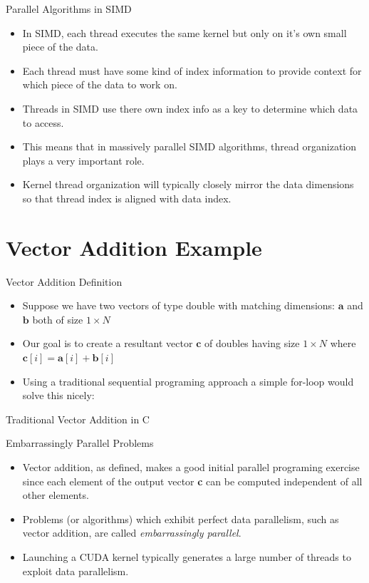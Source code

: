 \documentclass[handout]{beamer}
\begin{document}
\begin{frame}{Parallel Algorithms in SIMD}
\begin{itemize}
	\item<1->In SIMD, each thread executes the same kernel but only on it's own small piece of the data.
	\item<1->Each thread must have some kind of index information to provide context for which piece of the data to work on.
	\item<1->Threads in SIMD use there own index info as a key to determine which data to access.
	\item<1->This means that in massively parallel SIMD algorithms, thread organization plays a very important role.
	\item<1->Kernel thread organization will typically closely mirror the data dimensions so that thread index is aligned with data index.  
\end{itemize}
\end{frame}

\section{Vector Addition Example}
\begin{frame}{Vector Addition Definition}
\begin{itemize}
\itemsep1em
	\item<1>Suppose we have two vectors of type double with matching dimensions: $\textbf{a}$ and $\textbf{b}$ both of size $1\times N$
	\item<1>Our goal is to create a resultant vector $\textbf{c}$ of doubles having size $1\times N$ where $\textbf{c}[i] = \textbf{a}[i]+\textbf{b}[i]$ 
	\item<1>Using a traditional sequential programing approach a simple {\selectfont for}-loop would solve this nicely:
\end{itemize}

\end{frame}


\begin{frame}[fragile]{Traditional Vector Addition in C}

\end{frame}

\begin{frame}{Embarrassingly Parallel Problems}
\begin{itemize}
\itemsep1em
	\item<1->Vector addition, as defined, makes a good initial parallel programing exercise since each element of the output vector {\selectfont \textbf{c}} can be computed independent of all other elements. 
	\item<1->Problems (or algorithms) which exhibit perfect data parallelism, such as vector addition, are called \emph{embarrassingly parallel}.
	\item<1->Launching a CUDA kernel typically generates a large number of threads to exploit data parallelism. 
\end{itemize}
\end{frame}
\end{document}
